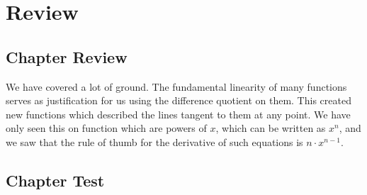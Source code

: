 \newpage

\section{Review}
\subsection{Chapter Review}
We have covered a lot of ground.  The fundamental linearity of many functions serves
as justification for us using the difference quotient on them.  This created new functions which 
described the lines tangent to them at any point.  We have only seen this on function which are
powers of $x$, which can be written as $x^n$, and we saw that the rule of thumb for the
derivative of such equations is $n\cdot x^{n-1}$.
\subsection{Chapter Test}


